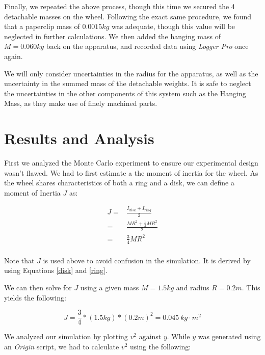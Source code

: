 \documentclass[12pt]{article}
\begin{document}
Finally, we repeated the above process, though this time we secured the 4 detachable masses on the wheel. Following the exact same procedure, we found that a paperclip mass of $0.0015kg$ was adequate, though this value will be neglected in further calculations. We then added the hanging mass of $M=0.060kg$ back on the apparatus, and recorded data using \textit{Logger Pro} once again.

We will only consider uncertainties in the radius for the apparatus, as well as the uncertainty in the summed mass of the detachable weights. It is safe to neglect the uncertainties in the other components of this system such as the Hanging Mass, as they make use of finely machined parts.


\section{Results and Analysis}
First we analyzed the Monte Carlo experiment to ensure our experimental design wasn't flawed. We had to first estimate a the moment of inertia for the wheel. As the wheel shares characteristics of both a ring and a disk, we can define a moment of Inertia $J$ as:

\begin{equation}
    \begin{split}
        J=&\frac{I_{disk}+I_{ring}}{2} \\
        =&\frac{MR^2+\frac{1}{2}MR^2}{2} \\
        =&\frac{3}{4}MR^2 \label{J} \\
    \end{split}
\end{equation}

\noindent Note that $J$ is used above to avoid confusion in the simulation. It is derived by using Equations \ref{disk} and \ref{ring}. \par
We can then solve for $J$ using a given mass $M=1.5kg$ and radius $R=0.2m$. This yields the following:

\begin{equation*}
    J=\frac{3}{4}*(1.5kg)*(0.2m)^2=0.045\ kg\cdot m^2
\end{equation*}

\indent We analyzed our simulation by plotting $v^2$ against $y$. While $y$ was generated using an \textit{Origin} script, we had to calculate $v^2$ using the following:
\end{document}
